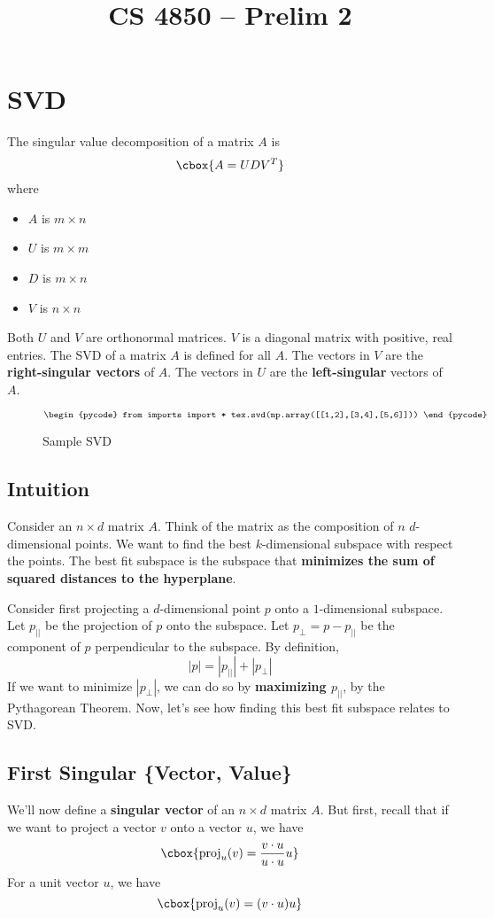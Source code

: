 \documentclass{hw}
\title{CS 4850 -- Prelim 2}
\renewcommand\emph[1]{{\bf\color{Blue}#1}}
\begin{document}
\maketitle

\section{SVD}
The singular value decomposition of a matrix $A$ is 
\[\cbox{
  A = UDV^T
}\]
where
\begin{itemize}
  \item $A$ is $m \times n$
  \item $U$ is $m \times m$
  \item $D$ is $m \times n$
  \item $V$ is $n \times n$
\end{itemize}
Both $U$ and $V$ are orthonormal matrices. $V$ is a diagonal matrix with
positive, real entries. The SVD of a matrix $A$ is defined for all $A$. The
vectors in $V$ are the \emph{right-singular vectors} of $A$. The vectors in $U$
are the \emph{left-singular} vectors of $A$.

\begin{figure}[ht]
  \centering
\[
\begin{pycode}
from imports import *
tex.svd(np.array([[1,2],[3,4],[5,6]]))
\end{pycode}
\]
  \caption{Sample SVD}
  \label{fig:sample-svd}
\end{figure}

\subsection{Intuition}
Consider an $n \times d$ matrix $A$. Think of the matrix as the composition of
$n$ $d$-dimensional points. We want to find the best $k$-dimensional subspace
with respect the points. The best fit subspace is the subspace that
\emph{minimizes the sum of squared distances to the hyperplane}. 

Consider first projecting a $d$-dimensional point $p$ onto a $1$-dimensional
subspace. Let $p_{||}$ be the projection of $p$ onto the subspace. Let
$p_{\perp} = p - p_{||}$ be the component of $p$ perpendicular to the subspace.
By definition,
\[
  |p| = |p_{||}| + |p_{\perp}|
\]
If we want to minimize $|p_\perp|$, we can do so by \emph{maximizing $p_{||}$},
by the Pythagorean Theorem. Now, let's see how finding this best fit subspace
relates to SVD.

\subsection{First Singular \{Vector, Value\}}
We'll now define a \emph{singular vector} of an $n \times d$ matrix $A$. But
first, recall that if we want to project a vector $v$ onto a vector $u$, we
have
\[\cbox{
  \text{proj}_{u}(v) = \frac{v \cdot u}{u \cdot u}u
}\]
For a unit vector $u$, we have
\[\cbox{
  \text{proj}_{u}(v) = (v \cdot u)u
}\]
\end{document}
